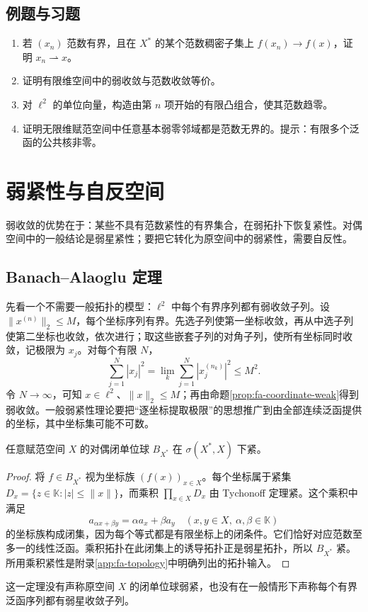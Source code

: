 \documentclass[UTF8,12pt,a4paper,fontset=fandol]{ctexbook}
\begin{document}
\section{例题与习题}
\begin{enumerate}
 \item 若 $(x_n)$ 范数有界，且在 $X^*$ 的某个范数稠密子集上 $f(x_n)\to f(x)$，证明 $x_n\rightharpoonup x$。
 \item 证明有限维空间中的弱收敛与范数收敛等价。
 \item 对 $\ell^2$ 的单位向量，构造由第 $n$ 项开始的有限凸组合，使其范数趋零。
 \item 证明无限维赋范空间中任意基本弱零邻域都是范数无界的。提示：有限多个泛函的公共核非零。
\end{enumerate}

\chapter{弱紧性与自反空间}
\label{chap:fa-reflexive}

弱收敛的优势在于：某些不具有范数紧性的有界集合，在弱拓扑下恢复紧性。对偶空间中的一般结论是弱星紧性；要把它转化为原空间中的弱紧性，需要自反性。

\section{Banach--Alaoglu 定理}
先看一个不需要一般拓扑的模型：$\ell^2$ 中每个有界序列都有弱收敛子列。设 $\|x^{(n)}\|_2\leq M$，每个坐标序列有界。先选子列使第一坐标收敛，再从中选子列使第二坐标也收敛，依次进行；取这些嵌套子列的对角子列，使所有坐标同时收敛，记极限为 $x_j$。对每个有限 $N$，
\[
 \sum_{j=1}^N|x_j|^2=\lim_k\sum_{j=1}^N|x_j^{(n_k)}|^2\leq M^2.
\]
令 $N\to\infty$，可知 $x\in\ell^2$、$\|x\|_2\leq M$；再由命题\ref{prop:fa-coordinate-weak}得到弱收敛。一般弱紧性理论要把“逐坐标提取极限”的思想推广到由全部连续泛函提供的坐标，其中坐标集可能不可数。

\begin{theorem}\label{thm:fa-alaoglu}
任意赋范空间 $X$ 的对偶闭单位球 $B_{X^*}$ 在 $\sigma(X^*,X)$ 下紧。
\end{theorem}
\begin{proof}
将 $f\in B_{X^*}$ 视为坐标族 $(f(x))_{x\in X}$。每个坐标属于紧集 $D_x=\{z\in\mathbb K:|z|\leq\|x\|\}$，而乘积 $\prod_{x\in X}D_x$ 由 Tychonoff 定理紧。这个乘积中满足
\[
 a_{\alpha x+\beta y}=\alpha a_x+\beta a_y
 \quad(x,y\in X,\ \alpha,\beta\in\mathbb K)
\]
的坐标族构成闭集，因为每个等式都是有限坐标上的闭条件。它们恰好对应范数至多一的线性泛函。乘积拓扑在此闭集上的诱导拓扑正是弱星拓扑，所以 $B_{X^*}$ 紧。所用乘积紧性是附录\ref{app:fa-topology}中明确列出的拓扑输入。
\end{proof}
这一定理没有声称原空间 $X$ 的闭单位球弱紧，也没有在一般情形下声称每个有界泛函序列都有弱星收敛子列。
\end{document}
